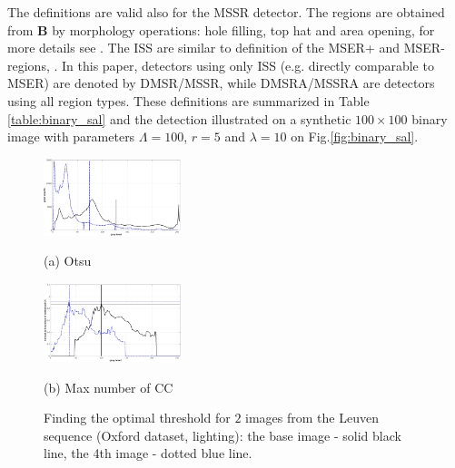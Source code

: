 \documentclass{article}
\def\B{{\mathbf B}}
\begin{document}
The definitions are valid also for the MSSR detector. The regions are obtained from $\B$ by morphology operations: hole filling, top hat and area opening, for more details see \cite{RangMSSR06, RangHumpb06}. The ISS are similar to definition of the MSER+ and MSER- regions, \cite{Matas2002BMVC}. In this paper, detectors using only ISS (e.g. directly comparable to MSER) are denoted by DMSR/MSSR, while DMSRA/MSSRA are detectors using all region types. These definitions are summarized in Table \ref{table:binary_sal} and the detection illustrated on a synthetic $100 \times 100$ binary image with parameters $\Lambda=100$, $r=5$ and $\lambda = 10$ on Fig.\ref{fig:binary_sal}.


\begin{figure}[htb]

\begin{minipage}[b]{.49\linewidth}
  \centering
  \centerline{\includegraphics[width=4.0cm]{./Figs/hist_otsu_leuven_1_4}}
  \centerline{(a) Otsu}\medskip
\end{minipage}
\hfill
\begin{minipage}[b]{0.49\linewidth}
  \centering
  \centerline{\includegraphics[width=4.0cm]{./Figs/hist_numcc_leuven_1_4}}
  \centerline{(b) Max number of CC}\medskip
\end{minipage}
\vspace{-0.25cm}
\caption{Finding the optimal threshold for $2$ images from the Leuven sequence 
(Oxford dataset, lighting): 
the base image - solid black line, the 4th image - dotted blue line.}
\label{fig:binary_hist}
%
\end{figure}
\end{document}
